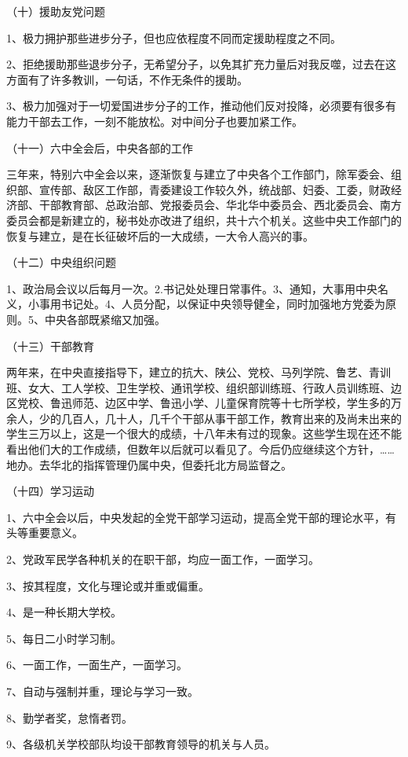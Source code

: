 （十）援助友党问题

1、极力拥护那些进步分子，但也应依程度不同而定援助程度之不同。

2、拒绝援助那些退步分子，无希望分子，以免其扩充力量后对我反噬，过去在这方面有了许多教训，一句话，不作无条件的援助。

3、极力加强对于一切爱国进步分子的工作，推动他们反对投降，必须要有很多有能力干部去工作，一刻不能放松。对中间分子也要加紧工作。


（十一）六中全会后，中央各部的工作

三年来，特别六中全会以来，逐渐恢复与建立了中央各个工作部门，除军委会、组织部、宣传部、敌区工作部，青委建设工作较久外，统战部、妇委、工委，财政经济部、干部教育部、总政治部、党报委员会、华北华中委员会、西北委员会、南方委员会都是新建立的，秘书处亦改进了组织，共十六个机关。这些中央工作部门的恢复与建立，是在长征破坏后的一大成绩，一大令人高兴的事。

（十二）中央组织问题

1、政治局会议以后每月一次。2.书记处处理日常事件。3、通知，大事用中央名义，小事用书记处。4、人员分配，以保证中央领导健全，同时加强地方党委为原则。5、中央各部既紧缩又加强。

（十三）干部教育

两年来，在中央直接指导下，建立的抗大、陕公、党校、马列学院、鲁艺、青训班、女大、工人学校、卫生学校、通讯学校、组织部训练班、行政人员训练班、边区党校、鲁迅师范、边区中学、鲁迅小学、儿童保育院等十七所学校，学生多的万余人，少的几百人，几十人，几千个干部从事干部工作，教育出来的及尚未出来的学生三万以上，这是一个很大的成绩，十八年未有过的现象。这些学生现在还不能看出他们大的工作成绩，但数年以后就可以看见了。今后仍应继续这个方针，……地办。去华北的指挥管理仍属中央，但委托北方局监督之。

（十四）学习运动

1、六中全会以后，中央发起的全党干部学习运动，提高全党干部的理论水平，有头等重要意义。

2、党政军民学各种机关的在职干部，均应一面工作，一面学习。

3、按其程度，文化与理论或并重或偏重。

4、是一种长期大学校。

5、每日二小时学习制。

6、一面工作，一面生产，一面学习。

7、自动与强制并重，理论与学习一致。

8、勤学者奖，怠惰者罚。

9、各级机关学校部队均设干部教育领导的机关与人员。

